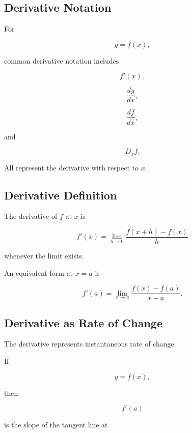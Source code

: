 \subsection{Derivative Notation}
\label{subsec:derivative-notation-table-reference}

For

\[
y=f(x),
\]

common derivative notation includes

\[
\boxed{
f'(x),
}
\]

\[
\boxed{
\frac{dy}{dx},
}
\]

\[
\boxed{
\frac{df}{dx},
}
\]

and

\[
\boxed{
D_xf.
}
\]

All represent the derivative with respect to \(x\).

\subsection{Derivative Definition}
\label{subsec:derivative-definition-reference}

The derivative of \(f\) at \(x\) is

\[
\boxed{
f'(x)
=
\lim_{h\to0}
\frac{
f(x+h)-f(x)
}{
h
}
}
\]

whenever the limit exists.

An equivalent form at \(x=a\) is

\[
\boxed{
f'(a)
=
\lim_{x\to a}
\frac{
f(x)-f(a)
}{
x-a
}.
}
\]

\subsection{Derivative as Rate of Change}
\label{subsec:derivative-rate-change-reference}

The derivative represents instantaneous rate of change.

If

\[
y=f(x),
\]

then

\[
\boxed{
f'(a)
}
\]

is the slope of the tangent line at

